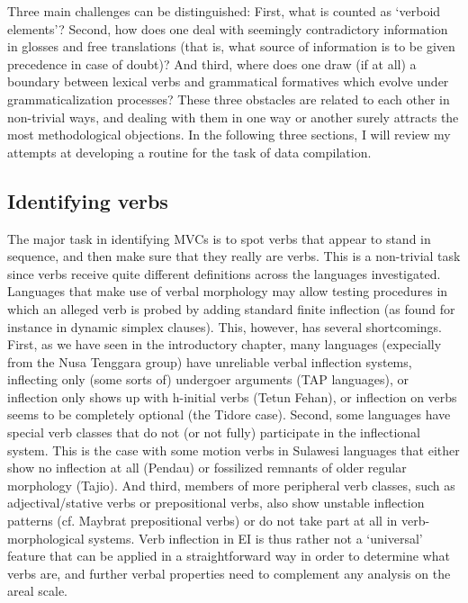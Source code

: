 Three main challenges can be distinguished: First, what is counted as `verboid elements'? Second, how does one deal with seemingly contradictory information in glosses and free translations (that is, what source of information is to be given precedence in case of doubt)? And third, where does one draw (if at all) a boundary between lexical verbs and grammatical formatives which evolve under grammaticalization processes? These three obstacles are related to each other in non-trivial ways, and dealing with them in one way or another surely attracts the most methodological objections. In the following three sections, I will review my attempts at developing a routine for the task of data compilation.

\subsection{Identifying verbs}\label{sec:identifyingverbs}

The major task in identifying MVCs is to spot verbs that appear to stand in sequence, and then make sure that they really are verbs. This is a non-trivial task since verbs receive quite different definitions across the languages investigated. Languages that make use of verbal morphology may allow testing procedures in which an alleged verb is probed by adding standard finite inflection (as found for instance in dynamic simplex clauses). This, however, has several shortcomings. First, as we have seen in the introductory chapter, many languages (expecially from the Nusa Tenggara group) have unreliable verbal inflection systems, inflecting only (some sorts of) undergoer arguments (TAP languages), or inflection only shows up with h-initial verbs (Tetun Fehan), or inflection on verbs seems to be completely optional (the Tidore case). Second, some languages have special verb classes that do not (or not fully) participate in the inflectional system. This is the case with some motion verbs in Sulawesi languages that either show no inflection at all (Pendau) or fossilized remnants of older regular morphology (Tajio). And third, members of more peripheral verb classes, such as adjectival/stative verbs or prepositional verbs, also show unstable inflection patterns (cf. Maybrat prepositional verbs) or do not take part at all in verb-morphological systems. Verb inflection in EI is thus rather not a `universal' feature that can be applied in a straightforward way in order to determine what verbs are, and further verbal properties need to complement any analysis on the areal scale.


